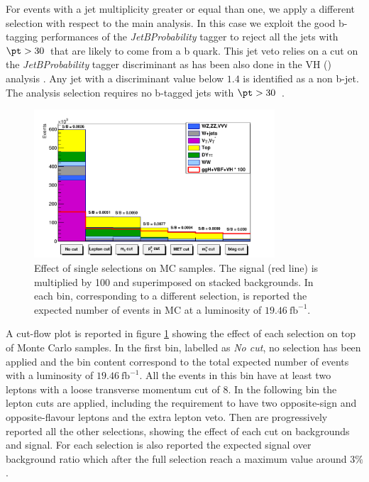 For events with a jet multiplicity greater or equal than one, we apply a different selection with respect to the main analysis. In this case we exploit the good b-tagging performances of the \textit{JetBProbability} tagger to reject all the jets with $\pt > 30$~\GeV that are likely to come from a b quark. This jet veto relies on a cut on the \textit{JetBProbability} tagger discriminant as has been also done in the VH (\hwwllnn) analysis \cite{CMS_PAS_HIG_13-017}. Any jet with a discriminant value below $1.4$ is identified as a non b-jet. The analysis selection requires no b-tagged jets with $\pt > 30$~\GeV.

\begin{figure}[b]
\centering
\includegraphics[width=0.8\textwidth]{images/cutflow2.pdf}
\caption{Effect of single selections on MC samples. The signal (red line) is multiplied by 100 and superimposed on stacked backgrounds. In each bin, corresponding to a different selection, is reported the expected number of events in MC at a luminosity of $19.46~\mathrm{fb}^{-1}$.\label{fig:cutflow}}
\end{figure}

A  cut-flow plot is reported in figure \ref{fig:cutflow} showing the effect of each selection on top of Monte Carlo samples. In the first bin, labelled as \textit{No cut}, no selection has been applied and the bin content correspond to the total expected number of events with a luminosity of $19.46~\mathrm{fb}^{-1}$. All the events in this bin have at least two leptons with a loose transverse momentum cut of $8$\GeV. In the following bin the lepton cuts are applied, including the requirement to have two opposite-sign and opposite-flavour leptons and the extra lepton veto. Then are progressively reported all the other selections, showing the effect of each cut on backgrounds and signal. For each selection is also reported the expected signal over background ratio which after the full selection reach a maximum value around $3\%$.

